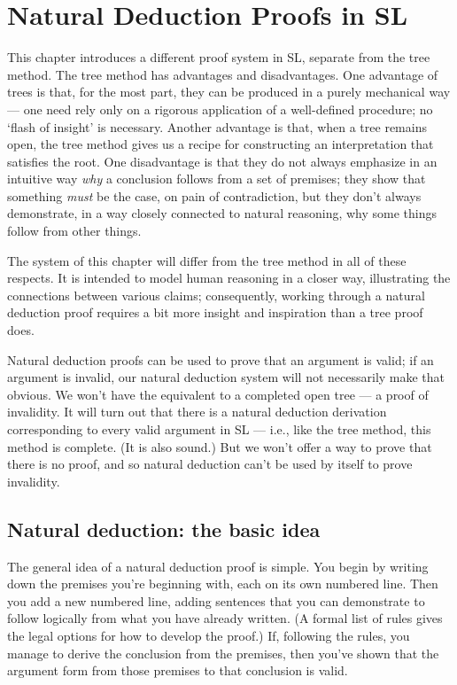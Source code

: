 \chapter{Natural Deduction Proofs in SL}
\label{ch.ND.proofs}

This chapter introduces a different proof system in SL, separate from the tree method. The tree method has advantages and disadvantages. One advantage of trees is that, for the most part, they can be produced in a purely mechanical way --- one need rely only on a rigorous application of a well-defined procedure; no `flash of insight' is necessary. Another advantage is that, when a tree remains open, the tree method gives us a recipe for constructing an interpretation that satisfies the root. One disadvantage is that they do not always emphasize in an intuitive way \emph{why} a conclusion follows from a set of premises; they show that something \emph{must} be the case, on pain of contradiction, but they don't always demonstrate, in a way closely connected to natural reasoning, why some things follow from other things.

The  system of this chapter will differ from the tree method in all of these respects. It is intended to model human reasoning in a closer way, illustrating the connections between various claims; consequently, working through a natural deduction proof requires a bit more insight and inspiration than a tree proof does.

Natural deduction proofs can be used to prove that an argument is valid; if an argument is invalid, our natural deduction system will not necessarily make that obvious. We won't have the equivalent to a completed open tree --- a proof of invalidity. It will turn out that there is a natural deduction derivation corresponding to every valid argument in SL --- i.e., like the tree method, this method is complete. (It is also sound.) But we won't offer a way to prove that there is no proof, and so natural deduction can't be used by itself to prove invalidity.


\section{Natural deduction: the basic idea}

The general idea of a natural deduction proof is simple. You begin by writing down the premises you're beginning with, each on its own numbered line. Then you add a new numbered line, adding sentences that you can demonstrate to follow logically from what you have already written. (A formal list of rules gives the legal options for how to develop the proof.) If, following the rules, you manage to derive the conclusion from the premises, then you've shown that the argument form from those premises to that conclusion is valid.

